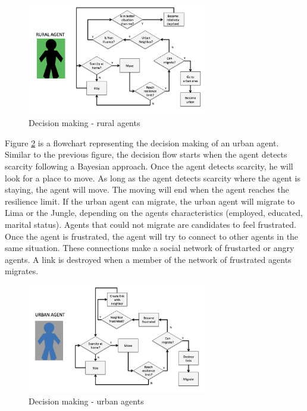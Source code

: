 \documentclass{article}
\begin{document}
\begin{figure}[ht]
\centering
  \includegraphics[width=0.7\textwidth]{ruralLogic}
  \caption[Decision making - rural agents]{Decision making - rural agents}
  \label{ruralLogic}
\end{figure}

Figure \ref{urbanLogic} is a flowchart representing the decision making of an urban agent. Similar to the previous figure, the decision flow starts when the agent detects scarcity following a Bayesian approach. Once the agent detects scarcity, he will look for a place to move. As long as the agent detects scarcity where the agent is staying, the agent will move. The moving will end when the agent reaches the resilience limit. If the urban agent can migrate, the urban agent will migrate to Lima or the Jungle, depending on the agent\textquotesingle s characteristics (employed, educated, marital status). Agents that could not migrate are candidates to feel frustrated. Once the agent is frustrated, the agent will try to connect to other agents in the same situation. These connections make a social network of frustarted or angry agents. A link is destroyed when a member of the network of frustrated agents migrates.

\begin{figure}[ht]
\centering
  \includegraphics[width=0.7\textwidth]{urbanLogic}
  \caption[Decision making - urban agents]{Decision making - urban agents}
  \label{urbanLogic}
\end{figure}
\end{document}
